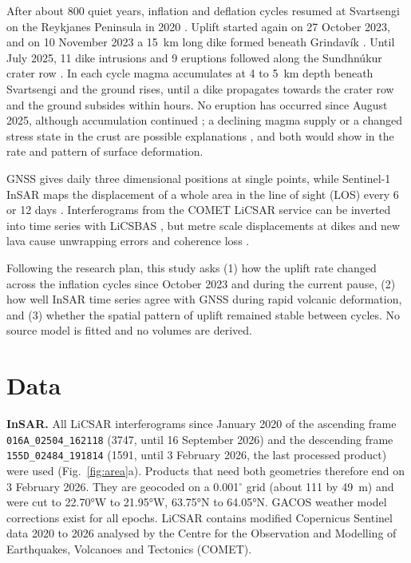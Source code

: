 \documentclass[10pt,a4paper,twocolumn]{article}
\begin{document}
After about 800 quiet years, inflation and deflation cycles resumed at Svartsengi on the Reykjanes Peninsula in 2020 \citep{flovenz2022,cubuk2021}. Uplift started again on 27 October 2023, and on 10 November 2023 a 15~km long dike formed beneath Grindavík \citep{sigmundsson2024,depascale2024}. Until July 2025, 11 dike intrusions and 9 eruptions followed along the Sundhnúkur crater row \citep{parks2025,parks2026}. In each cycle magma accumulates at 4 to 5~km depth beneath Svartsengi and the ground rises, until a dike propagates towards the crater row and the ground subsides within hours. No eruption has occurred since August 2025, although accumulation continued \citep{imo2026}; a declining magma supply or a changed stress state in the crust are possible explanations \citep{parks2026}, and both would show in the rate and pattern of surface deformation.

GNSS gives daily three dimensional positions at single points, while Sentinel-1 InSAR maps the displacement of a whole area in the line of sight (LOS) every 6 or 12 days \citep{torres2012}. Interferograms from the COMET LiCSAR service \citep{lazecky2020} can be inverted into time series with LiCSBAS \citep{morishita2020}, but metre scale displacements at dikes and new lava cause unwrapping errors and coherence loss \citep{hanssen2001}.

Following the research plan, this study asks (1) how the uplift rate changed across the inflation cycles since October 2023 and during the current pause, (2) how well InSAR time series agree with GNSS during rapid volcanic deformation, and (3) whether the spatial pattern of uplift remained stable between cycles. No source model is fitted and no volumes are derived.

\section{Data}

\textbf{InSAR.} All LiCSAR interferograms since January 2020 of the ascending frame \texttt{016A\_02504\_162118} (3747, until 16 September 2026) and the descending frame \texttt{155D\_02484\_191814} (1591, until 3 February 2026, the last processed product) were used (Fig.~\ref{fig:area}a). Products that need both geometries therefore end on 3 February 2026. They are geocoded on a 0.001$^\circ$ grid (about 111 by 49~m) and were cut to \ang{22.70}W to \ang{21.95}W, \ang{63.75}N to \ang{64.05}N. GACOS weather model corrections \citep{yu2018} exist for all epochs. LiCSAR contains modified Copernicus Sentinel data 2020 to 2026 analysed by the Centre for the Observation and Modelling of Earthquakes, Volcanoes and Tectonics (COMET).
\end{document}
